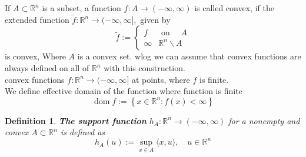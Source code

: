 \documentclass[oneside]{book}
\newtheorem{mydef}{Definition}[section]
\begin{document}
	If $A \subset \mathbb{R}^{n}$ is a subset, a function $f: A \rightarrow(-\infty, \infty)$ is called convex, if the extended function $\tilde{f}: \mathbb{R}^{n} \rightarrow(-\infty, \infty],$ given by
	$$
	\tilde{f}:=\left\{\begin{array}{ll}
	f & \text { on } \quad A \\
	\infty & \mathbb{R}^{n} \backslash A
	\end{array}\right.
	$$
	is convex,  Where  $A$ is a convex set. wlog we can assume that convex functions are always defined on all of $\mathbb{R}^{n}$ with this construction.\\
	convex functions $f: \mathbb{R}^{n} \rightarrow(-\infty, \infty]$ at points, where $f$ is finite. \\
	We define effective domain of the function where function is finite
	$$
	\operatorname{dom} f:=\left\{x \in \mathbb{R}^{n}: f(x)<\infty\right\}
	$$
	
	
	
	\begin{mydef} \label{d:10}
		\textbf{The support function }$h_{A}: \mathbb{R}^{n} \rightarrow(-\infty, \infty) $  for a nonempty and convex $A \subset \mathbb{R}^{n}$ is defined as
		$$
		h_{A}(u):=\sup _{x \in A}\langle x, u\rangle, \quad u \in \mathbb{R}^{n}
		$$
		
	\end{mydef}
	
	
	
\end{document}
